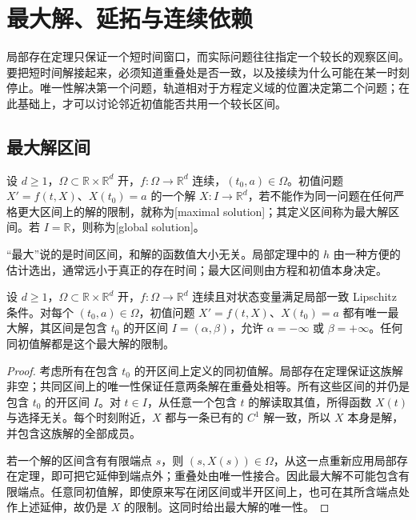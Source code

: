 \section{最大解、延拓与连续依赖}
\label{b2:sec:ode-continuation}

局部存在定理只保证一个短时间窗口，而实际问题往往指定一个较长的观察区间。要把短时间解接起来，必须知道重叠处是否一致，以及接续为什么可能在某一时刻停止。唯一性解决第一个问题，轨道相对于方程定义域的位置决定第二个问题；在此基础上，才可以讨论邻近初值能否共用一个较长区间。

\subsection{最大解区间}
\label{b2:subsec:ode-maximal-interval}

\begin{definition}\label{b2:def:ode-maximal-solution}
设 \(d\geq1\)，\(\Omega\subset\mathbb R\times\mathbb R^d\) 开，\(f\colon\Omega\to\mathbb R^d\) 连续，\((t_0,a)\in\Omega\)。初值问题 \(X'=f(t,X)\)、\(X(t_0)=a\) 的一个解 \(X\colon I\to\mathbb R^d\)，若不能作为同一问题在任何严格更大区间上的解的限制，就称为[maximal solution]；其定义区间称为最大解区间。若 \(I=\mathbb R\)，则称为[global solution]。
\end{definition}

“最大”说的是时间区间，和解的函数值大小无关。局部定理中的 \(h\) 由一种方便的估计选出，通常远小于真正的存在时间；最大区间则由方程和初值本身决定。

\begin{proposition}\label{b2:prop:ode-maximal-solution}
设 \(d\geq1\)，\(\Omega\subset\mathbb R\times\mathbb R^d\) 开，\(f\colon\Omega\to\mathbb R^d\) 连续且对状态变量满足局部一致 Lipschitz 条件。对每个 \((t_0,a)\in\Omega\)，初值问题 \(X'=f(t,X)\)、\(X(t_0)=a\) 都有唯一最大解，其区间是包含 \(t_0\) 的开区间 \(I=(\alpha,\beta)\)，允许 \(\alpha=-\infty\) 或 \(\beta=+\infty\)。任何同初值解都是这个最大解的限制。
\end{proposition}
\begin{proof}
考虑所有在包含 \(t_0\) 的开区间上定义的同初值解。局部存在定理保证这族解非空；共同区间上的唯一性保证任意两条解在重叠处相等。所有这些区间的并仍是包含 \(t_0\) 的开区间 \(I\)。对 \(t\in I\)，从任意一个包含 \(t\) 的解读取其值，所得函数 \(X(t)\) 与选择无关。每个时刻附近，\(X\) 都与一条已有的 \(C^1\) 解一致，所以 \(X\) 本身是解，并包含这族解的全部成员。

若一个解的区间含有有限端点 \(s\)，则 \((s,X(s))\in\Omega\)，从这一点重新应用局部存在定理，即可把它延伸到端点外；重叠处由唯一性接合。因此最大解不可能包含有限端点。任意同初值解，即使原来写在闭区间或半开区间上，也可在其所含端点处作上述延伸，故仍是 \(X\) 的限制。这同时给出最大解的唯一性。
\end{proof}

